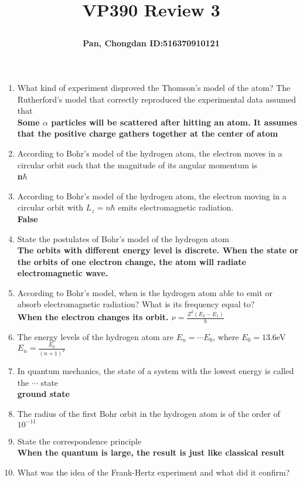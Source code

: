 \documentclass[a4paper]{article}
\title{\Large \textbf{VP390 Review 3}\\
\author{\textbf{Pan, Chongdan ID:516370910121}\\
}
}
\begin{document}
\maketitle
\begin{enumerate}
    \item What kind of experiment disproved the Thomson’s model of the atom? The Rutherford’s model that correctly reproduced the experimental data assumed that 
    \\ \textbf{Some $\alpha$ particles will be scattered after hitting an atom. It assumes that the positive charge gathers together at the center of atom}
    \item According to Bohr’s model of the hydrogen atom, the electron moves in a circular orbit such that the magnitude of its angular momentum is
    \\ \textbf{n$\hbar$}
    \item According to Bohr’s model of the hydrogen atom, the electron moving in a circular orbit with $L_z=n\hbar$ emits electromagnetic radiation.
    \\ \textbf{False}
    \item State the postulates of Bohr’s model of the hydrogen atom
    \\ \textbf{The orbits with different energy level is discrete. When the state or the orbits of one electron change, the atom will radiate electromagnetic wave.}
    \item According to Bohr’s model, when is the hydrogen atom able to emit or absorb electromagnetic
    radiation? What is its frequency equal to?
    \\ \textbf{When the electron changes its orbit. $\nu=\frac{Z^2(E_2-E_1)}{h}$}
    \item The energy levels of the hydrogen atom are $E_n=\cdots E_0$, where $E_0=13.6$eV 
    \\ \textbf{$E_n=\frac{E_0}{(n+1)^2}$}
    \item In quantum mechanics, the state of a system with the lowest energy is called the $\cdots$ state
    \\ \textbf{ground state}
    \item The radius of the first Bohr orbit in the hydrogen atom is of the order of
    \\ \textbf{$10^{-11}$}
    \item State the correspondence principle
    \\ \textbf{When the quantum is large, the result is just like classical result}
    \item What was the idea of the Frank-Hertz experiment and what did it confirm?

\end{enumerate}
\end{document}
